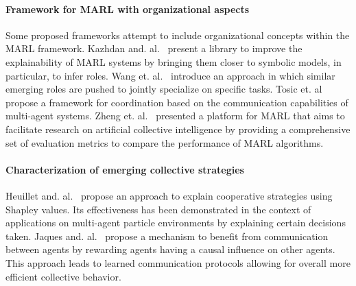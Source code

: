 \documentclass[runningheads]{llncs}
\begin{document}




\paragraph{\textbf{Framework for MARL with organizational aspects}}
%
Some proposed frameworks attempt to include organizational concepts within the MARL framework.
Kazhdan and. al.~\cite{Kazhdan2020} present a library to improve the explainability of MARL systems by bringing them closer to symbolic models, in particular, to infer roles.%
%
Wang et. al.~\cite{Wang2020} introduce an approach in which similar emerging roles are pushed to jointly specialize on specific tasks.
%
Tosic et. al~\cite{Tosic2010} propose a framework for coordination based on the communication capabilities of multi-agent systems.
%
Zheng et. al.~\cite{Zheng2018} presented a platform for MARL that aims to facilitate research on artificial collective intelligence by providing a comprehensive set of evaluation metrics to compare the performance of MARL algorithms.

\paragraph{\textbf{Characterization of emerging collective strategies}}
%
Heuillet and. al.~\cite{Heuillet2022} propose an approach to explain cooperative strategies using Shapley values. Its effectiveness has been demonstrated in the context of applications on multi-agent particle environments by explaining certain decisions taken.
%
Jaques and. al.~\cite{Jaques2019} propose a mechanism to benefit from communication between agents by rewarding agents having a causal influence on other agents. This approach leads to learned communication protocols allowing for overall more efficient collective behavior.
\end{document}
